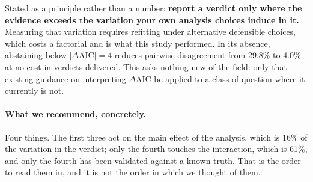 \documentclass[11pt,a4paper]{article}
\begin{document}
Stated as a principle rather than a number: \textbf{report a verdict only where
the evidence exceeds the variation your own analysis choices induce in it.}
Measuring that variation requires refitting under alternative defensible choices,
which costs a factorial and is what this study performed. In its absence,
abstaining below $|\Delta\mathrm{AIC}| = 4$ reduces pairwise disagreement from
29.8\% to 4.0\% at no cost in verdicts delivered. This asks nothing new of the
field: only that existing guidance on interpreting $\Delta$AIC be applied to a
class of question where it currently is not.

\paragraph{What we recommend, concretely.} Four things. The first three act on
the main effect of the analysis, which is 16\% of the variation in the verdict;
only the fourth touches the interaction, which is 61\%, and only the fourth has
been validated against a known truth. That is the order to read them in, and it
is not the order in which we thought of them.
\end{document}
